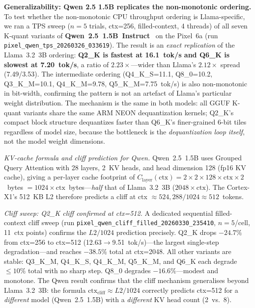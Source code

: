 \documentclass[conference]{IEEEtran}
\begin{document}
\textbf{Generalizability: Qwen 2.5 1.5B replicates the non-monotonic ordering.}
To test whether the non-monotonic CPU throughput ordering is Llama-specific, we ran
a TPS sweep ($n{=}5$ trials, ctx=256, filled-context, 4 threads) of all seven
K-quant variants of \textbf{Qwen~2.5~1.5B~Instruct}~\cite{qwen25} on the Pixel~6a
(run \texttt{pixel\_qwen\_tps\_20260326\_033619}).
The result is an \emph{exact replication} of the Llama~3.2~3B ordering:
\textbf{Q2\_K is fastest at 16.1~tok/s and Q6\_K is slowest at 7.20~tok/s},
a ratio of $2.23\times$---wider than Llama's $2.12\times$ spread (7.49/3.53).
The intermediate ordering (Q4\_K\_S=11.1, Q8\_0=10.2, Q3\_K\_M=10.1, Q4\_K\_M=9.78,
Q5\_K\_M=7.75~tok/s) is also non-monotonic in bit-width, confirming the pattern is
not an artefact of Llama's particular weight distribution.
The mechanism is the same in both models: all GGUF K-quant variants share the same
ARM NEON dequantization kernels; Q2\_K's compact block structure dequantizes faster
than Q6\_K's finer-grained 6-bit tiles regardless of model size, because the
bottleneck is the \emph{dequantization loop itself}, not the model weight dimensions.

\textit{KV-cache formula and cliff prediction for Qwen.}
Qwen~2.5~1.5B uses Grouped Query Attention with 28 layers, 2~KV heads, and
head dimension 128 (fp16 KV cache), giving a per-layer cache footprint of
$C_{\text{layer}}(\text{ctx}) = 2 \times 2 \times 128 \times \text{ctx} \times 2$~bytes
$= 1024 \times \text{ctx}$~bytes---\emph{half} that of Llama~3.2~3B ($2048 \times \text{ctx}$).
The Cortex-X1's 512~KB L2 therefore predicts a cliff at
ctx $\approx 524{,}288 / 1024 \approx 512$~tokens.

\textit{Cliff sweep: Q2\_K cliff confirmed at ctx=512.}
A dedicated sequential filled-context cliff sweep
(run \texttt{pixel\_qwen\_cliff\_filled\_20260330\_235410}, $n{=}5$/cell, 11~ctx points)
confirms the $L2/1024$ prediction precisely.
Q2\_K drops $-24.7\%$ from ctx=256 to ctx=512 (12.63$\to$9.51~tok/s)---the
largest single-step degradation---and reaches $-38.5\%$ total at ctx=2048.
All other variants are stable: Q3\_K\_M, Q4\_K\_S, Q4\_K\_M, Q5\_K\_M, and Q6\_K
each degrade $\leq10\%$ total with no sharp step.
Q8\_0 degrades $-16.6\%$---modest and monotone.
The Qwen result confirms that the cliff mechanism generalises beyond Llama~3.2~3B:
the formula $\text{ctx}_{\text{cliff}}\approx L2/1024$ correctly predicts ctx=512 for
a \emph{different} model (Qwen~2.5~1.5B) with a \emph{different} KV head count (2~vs.~8).
\end{document}
